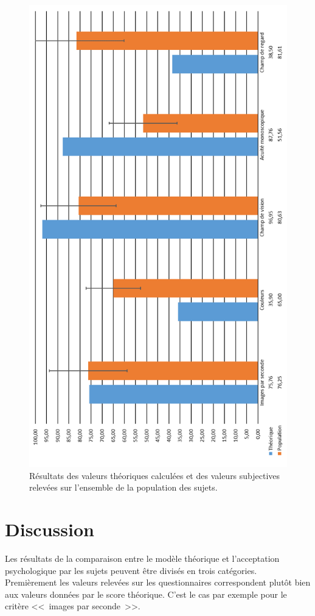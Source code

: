 	\begin{figure}[h]
		\centering
		\includegraphics[scale=.7]{Figures/ResultsComparison}
		\caption{Résultats des valeurs théoriques calculées et des valeurs subjectives relevées sur l'ensemble de la population des sujets.}
		\label{fig:results_comparison}
	\end{figure}
	
	\section{Discussion}
	\par Les résultats de la comparaison entre le modèle théorique et l'acceptation psychologique par les sujets peuvent être divisés en trois catégories. Premièrement les valeurs relevées sur les questionnaires correspondent plutôt bien aux valeurs données par le score théorique. C'est le cas par exemple pour le critère <<~images par seconde~>>.
	
